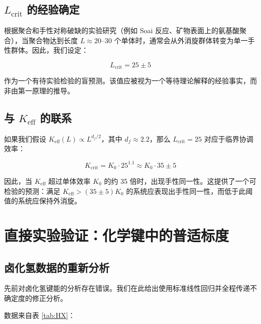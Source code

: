 \documentclass[11pt,a4paper]{article}
\newcommand{\Keff}{K_{\mathrm{eff}}}
\newcommand{\df}{d_{\!f}}
\newcommand{\Kcrit}{K_{\mathrm{crit}}}
\begin{document}
	\subsection{\(L_{\text{crit}}\) 的经验确定}
	
	根据聚合和手性对称破缺的实验研究（例如 Soai 反应、矿物表面上的氨基酸聚合），当聚合物达到长度 \(L \approx 20\)–\(30\) 个单体时，通常会从外消旋群体转变为单一手性群体。因此，我们设定：
	
	\begin{equation}
		\boxed{L_{\text{crit}} = 25 \pm 5}
		\label{eq:Lcrit-empirical}
	\end{equation}
	
	作为一个有待实验检验的盲预测。该值应被视为一个等待理论解释的经验事实，而非由第一原理的推导。
	
	\subsection{与 \(\Keff\) 的联系}
	
	如果我们假设 \(\Keff(L) \propto L^{\df/2}\)，其中 \(\df \approx 2.2\)，那么 \(L_{\text{crit}} = 25\) 对应于临界协调效率：
	
	\begin{equation}
		\Kcrit = K_0 \cdot 25^{1.1} \approx K_0 \cdot 35 \pm 5
		\label{eq:Kcrit-from-L}
	\end{equation}
	
	因此，当 \(\Keff\) 超过单体效率 \(K_0\) 的约 35 倍时，出现手性同一性。这提供了一个可检验的预测：满足 \(\Keff > (35 \pm 5) K_0\) 的系统应表现出手性同一性，而低于此阈值的系统应保持外消旋。
	
	\section{直接实验验证：化学键中的普适标度}
	\label{sec:experimental-verification}
	
	\subsection{卤化氢数据的重新分析}
	
	先前对卤化氢键能的分析存在错误。我们在此给出使用标准线性回归并全程传递不确定度的修正分析。
	
	数据来自表 \ref{tab:HX}：
	
\end{document}
